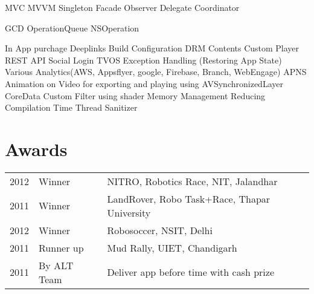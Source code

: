 \documentclass[]{deedy-resume-openfont}
\begin{document}
\begin{minipage}[t]{0.66\textwidth}
\sectionsep

MVC MVVM Singleton Facade Observer Delegate Coordinator 
\sectionsep


GCD OperationQueue NSOperation
\sectionsep

  \textbullet{} In App purchage  \textbullet{} Deeplinks 
\textbullet{} Build Configuration \textbullet{} DRM Contents 
\textbullet{} Custom Player \textbullet{} REST API \textbullet{} Social Login \textbullet{} TVOS \textbullet{} Exception Handling (Restoring App State) \textbullet{} Various Analytics(AWS, Appsflyer, google, Firebase, Branch, WebEngage) \textbullet{} APNS \textbullet{} Animation on Video for exporting and playing using AVSynchronizedLayer \textbullet{} CoreData \textbullet{} Custom Filter using shader \textbullet{}  Memory Management  \textbullet{} Reducing Compilation Time \textbullet{} Thread Sanitizer

\sectionsep


\section{Awards} 
\begin{tabular}{rll}
2012	     & Winner  &  NITRO, Robotics Race, NIT, Jalandhar\\
2011	     & Winner  &  LandRover, Robo Task+Race, Thapar University\\
2012	     & Winner  & Robosoccer, NSIT, Delhi \\
2011     & Runner up & Mud Rally, UIET, Chandigarh  \\
2011     & By ALT Team & Deliver app before time with cash prize  \\
\end{tabular}
\sectionsep



\end{minipage}
\end{document}

